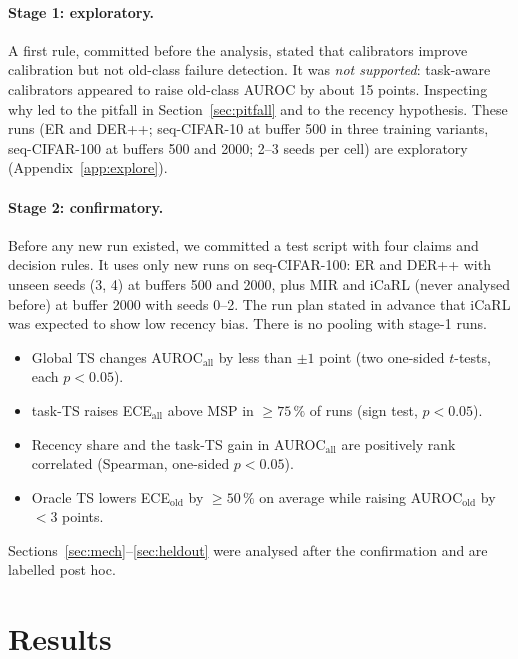 \documentclass[11pt]{article}
\newcommand{\taskts}{task-TS}
\begin{document}
\paragraph{Stage 1: exploratory.} A first rule, committed before the analysis, stated that
calibrators improve calibration but not old-class failure detection. It was \emph{not supported}:
task-aware calibrators appeared to raise old-class AUROC by about 15 points. Inspecting why led to
the pitfall in Section~\ref{sec:pitfall} and to the recency hypothesis. These \nExplore{} runs (ER
and DER++; seq-CIFAR-10 at buffer 500 in three training variants, seq-CIFAR-100 at buffers 500 and
2000; 2--3 seeds per cell) are exploratory (Appendix~\ref{app:explore}).

\paragraph{Stage 2: confirmatory.} Before any new run existed, we committed a test script with four
claims and decision rules. It uses only \nConfirm{} new runs on seq-CIFAR-100: ER and DER++ with
unseen seeds (3, 4) at buffers 500 and 2000, plus MIR and iCaRL (never analysed before) at buffer
2000 with seeds 0--2. The run plan stated in advance that iCaRL was expected to show low recency
bias. There is no pooling with stage-1 runs.
\begin{itemize}
\item[C1] Global TS changes AUROC$_\mathrm{all}$ by less than $\pm1$ point (two one-sided
  $t$-tests, each $p<0.05$).
\item[C2] \taskts{} raises ECE$_\mathrm{all}$ above MSP in $\geq75\,\%$ of runs (sign test, $p<0.05$).
\item[C3] Recency share and the \taskts{} gain in AUROC$_\mathrm{all}$ are positively rank
  correlated (Spearman, one-sided $p<0.05$).
\item[C4] Oracle TS lowers ECE$_\mathrm{old}$ by $\geq50\,\%$ on average while raising
  AUROC$_\mathrm{old}$ by $<3$ points.
\end{itemize}
Sections~\ref{sec:mech}--\ref{sec:heldout} were analysed after the confirmation and are labelled
post hoc.

\section{Results}
\end{document}
